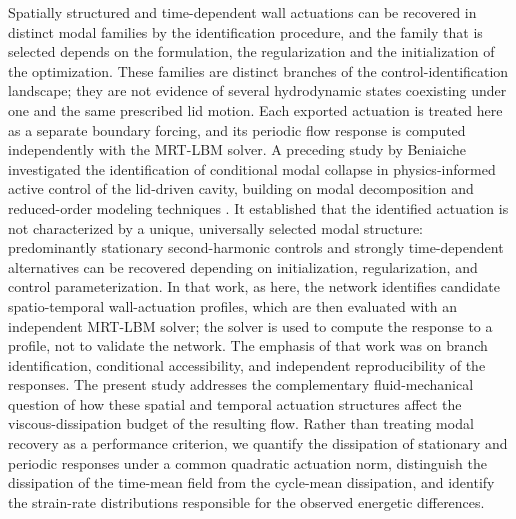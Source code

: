 \documentclass[11pt,a4paper]{article}
\newenvironment{chgadd}{\par\color{blue}}{\par\color{black}}
\begin{document}
\begin{chgadd}
Spatially structured and time-dependent wall actuations can be recovered in
distinct modal families by the identification procedure, and the family that is
selected depends on the formulation, the regularization and the initialization of
the optimization. These families are distinct branches of the
control-identification landscape; they are not evidence of several hydrodynamic
states coexisting under one and the same prescribed lid motion. Each exported
actuation is treated here as a separate boundary forcing, and its
periodic flow response is computed independently with the MRT-LBM solver. A
preceding study by Beniaiche \cite{beniaiche2026} investigated the identification
of conditional modal collapse in
physics-informed active control of the lid-driven cavity, building on modal
decomposition and reduced-order modeling techniques
\cite{schmid2010dmd,taira2017modal,sipp2010global,noack2003hierarchy}. It established that the
identified actuation is not characterized by a unique, universally selected modal
structure: predominantly stationary second-harmonic controls and strongly
time-dependent alternatives can be recovered depending on initialization,
regularization, and control parameterization. In that work, as here, the network
identifies candidate spatio-temporal wall-actuation profiles, which are then
evaluated with an independent MRT-LBM solver; the solver is used to compute the
response to a profile, not to validate the network. The emphasis of that work was on branch identification,
conditional accessibility, and independent reproducibility of the responses. The present
study addresses the complementary fluid-mechanical question of how these spatial
and temporal actuation structures affect the viscous-dissipation budget of the
resulting flow. Rather than treating modal recovery as a performance criterion, we
quantify the dissipation of stationary and periodic responses under a common
quadratic actuation norm, distinguish the dissipation of the time-mean field from
the cycle-mean dissipation, and identify the strain-rate distributions responsible
for the observed energetic differences.


\end{chgadd}
\end{document}
